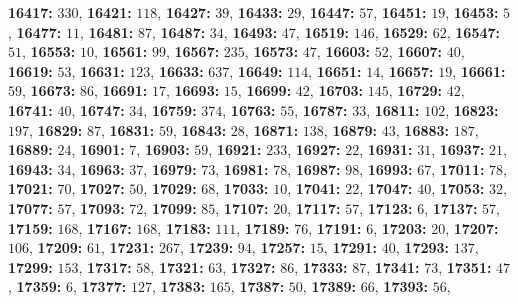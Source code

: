 \textsf{\bfseries 16417:} $330$, \textsf{\bfseries 16421:} $118$, \textsf{\bfseries 16427:} $39$, \textsf{\bfseries 16433:} $29$, \textsf{\bfseries 16447:} $57$, \textsf{\bfseries 16451:} $19$, \textsf{\bfseries 16453:} $5$, \textsf{\bfseries 16477:} $11$, \textsf{\bfseries 16481:} $87$, \textsf{\bfseries 16487:} $34$, \textsf{\bfseries 16493:} $47$, \textsf{\bfseries 16519:} $146$, \textsf{\bfseries 16529:} $62$, \textsf{\bfseries 16547:} $51$, \textsf{\bfseries 16553:} $10$, \textsf{\bfseries 16561:} $99$, \textsf{\bfseries 16567:} $235$, \textsf{\bfseries 16573:} $47$, \textsf{\bfseries 16603:} $52$, \textsf{\bfseries 16607:} $40$, \textsf{\bfseries 16619:} $53$, \textsf{\bfseries 16631:} $123$, \textsf{\bfseries 16633:} $637$, \textsf{\bfseries 16649:} $114$, \textsf{\bfseries 16651:} $14$, \textsf{\bfseries 16657:} $19$, \textsf{\bfseries 16661:} $59$, \textsf{\bfseries 16673:} $86$, \textsf{\bfseries 16691:} $17$, \textsf{\bfseries 16693:} $15$, \textsf{\bfseries 16699:} $42$, \textsf{\bfseries 16703:} $145$, \textsf{\bfseries 16729:} $42$, \textsf{\bfseries 16741:} $40$, \textsf{\bfseries 16747:} $34$, \textsf{\bfseries 16759:} $374$, \textsf{\bfseries 16763:} $55$, \textsf{\bfseries 16787:} $33$, \textsf{\bfseries 16811:} $102$, \textsf{\bfseries 16823:} $197$, \textsf{\bfseries 16829:} $87$, \textsf{\bfseries 16831:} $59$, \textsf{\bfseries 16843:} $28$, \textsf{\bfseries 16871:} $138$, \textsf{\bfseries 16879:} $43$, \textsf{\bfseries 16883:} $187$, \textsf{\bfseries 16889:} $24$, \textsf{\bfseries 16901:} $7$, \textsf{\bfseries 16903:} $59$, \textsf{\bfseries 16921:} $233$, \textsf{\bfseries 16927:} $22$, \textsf{\bfseries 16931:} $31$, \textsf{\bfseries 16937:} $21$, \textsf{\bfseries 16943:} $34$, \textsf{\bfseries 16963:} $37$, \textsf{\bfseries 16979:} $73$, \textsf{\bfseries 16981:} $78$, \textsf{\bfseries 16987:} $98$, \textsf{\bfseries 16993:} $67$, \textsf{\bfseries 17011:} $78$, \textsf{\bfseries 17021:} $70$, \textsf{\bfseries 17027:} $50$, \textsf{\bfseries 17029:} $68$, \textsf{\bfseries 17033:} $10$, \textsf{\bfseries 17041:} $22$, \textsf{\bfseries 17047:} $40$, \textsf{\bfseries 17053:} $32$, \textsf{\bfseries 17077:} $57$, \textsf{\bfseries 17093:} $72$, \textsf{\bfseries 17099:} $85$, \textsf{\bfseries 17107:} $20$, \textsf{\bfseries 17117:} $57$, \textsf{\bfseries 17123:} $6$, \textsf{\bfseries 17137:} $57$, \textsf{\bfseries 17159:} $168$, \textsf{\bfseries 17167:} $168$, \textsf{\bfseries 17183:} $111$, \textsf{\bfseries 17189:} $76$, \textsf{\bfseries 17191:} $6$, \textsf{\bfseries 17203:} $20$, \textsf{\bfseries 17207:} $106$, \textsf{\bfseries 17209:} $61$, \textsf{\bfseries 17231:} $267$, \textsf{\bfseries 17239:} $94$, \textsf{\bfseries 17257:} $15$, \textsf{\bfseries 17291:} $40$, \textsf{\bfseries 17293:} $137$, \textsf{\bfseries 17299:} $153$, \textsf{\bfseries 17317:} $58$, \textsf{\bfseries 17321:} $63$, \textsf{\bfseries 17327:} $86$, \textsf{\bfseries 17333:} $87$, \textsf{\bfseries 17341:} $73$, \textsf{\bfseries 17351:} $47$, \textsf{\bfseries 17359:} $6$, \textsf{\bfseries 17377:} $127$, \textsf{\bfseries 17383:} $165$, \textsf{\bfseries 17387:} $50$, \textsf{\bfseries 17389:} $66$, \textsf{\bfseries 17393:} $56$, 
